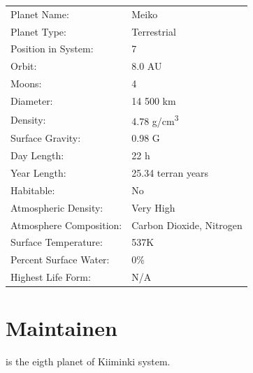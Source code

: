 \documentclass{tufte-book}
\begin{document}
\bigskip
\begin{minipage}{\textwidth}
\begin{center}
\begin{tabular}{ll}
\toprule
Planet Name: & Meiko \\
Planet Type: & Terrestrial \\
Position in System: & 7 \\
Orbit: & 8.0 AU \\
Moons: & 4 \\
Diameter: & 14 500 km \\
Density: & 4.78 g/cm\textsuperscript{3} \\
Surface Gravity: & 0.98 G \\
Day Length: & 22 h \\
Year Length: & 25.34 terran years \\
Habitable: & No \\
\quad Atmospheric Density: & Very High \\
\quad Atmosphere Composition: & Carbon Dioxide, Nitrogen \\
\quad Surface Temperature: & 537K \\
\quad Percent Surface Water: & 0\% \\
\quad Highest Life Form: & N/A \\

\bottomrule
\end{tabular}
\end{center}
\end{minipage}


\section{Maintainen}

 is the eigth planet of Kiiminki system.
\end{document}
